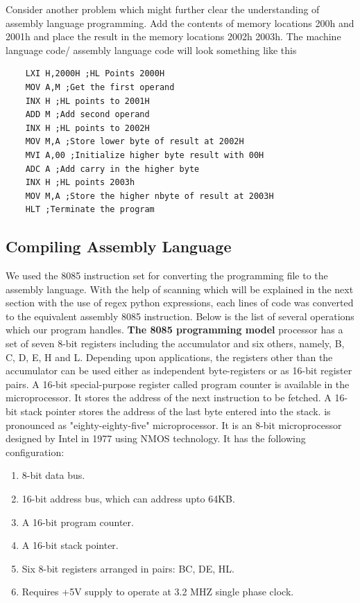 \documentclass[a4paper,12pt]{extarticle}
\begin{document}
	Consider another problem which might further clear the understanding of assembly
	language programming.
	Add the contents of memory locations 200h and 2001h and place the result
	in the memory locations 2002h 2003h.
	The machine language code/ assembly language code will look something like this
	\begin{verbatim}
	LXI H,2000H ;HL Points 2000H
	MOV A,M ;Get the first operand
	INX H ;HL points to 2001H
	ADD M ;Add second operand
	INX H ;HL points to 2002H
	MOV M,A ;Store lower byte of result at 2002H
	MVI A,00 ;Initialize higher byte result with 00H
	ADC A ;Add carry in the higher byte
	INX H ;HL points 2003h
	MOV M,A ;Store the higher nbyte of result at 2003H
	HLT ;Terminate the program
	\end{verbatim}
	\subsection{Compiling Assembly Language}
	We used the 8085 instruction set for converting the programming file to the assembly
	language.\newline
	With the help of scanning which will be explained in the next section with the use of
	regex python expressions, each lines of code was converted to the equivalent assembly
	8085 instruction. Below is the list of several operations which our program handles.\newline
	\textbf{The 8085 programming model}
	 processor has a set of seven 8-bit registers including the accumulator and six
	others, namely, B, C, D, E, H and L. Depending upon applications, the registers
	other than the accumulator can be used either as independent byte-registers or as
	16-bit register pairs. A 16-bit special-purpose register called program counter is
	available in the microprocessor. It stores the address of the next instruction to be
	fetched. A 16-bit stack pointer stores the address of the last byte entered into the
	stack. is pronounced as "eighty-eighty-five" microprocessor. It is an 8-bit microprocessor
	designed by Intel in 1977 using NMOS technology.\newline
	It has the following configuration: 
	\begin{enumerate}
		\item 8-bit data bus.
		\item 16-bit address bus, which can address upto 64KB.
		\item A 16-bit program counter.
		\item A 16-bit stack pointer.
		\item Six 8-bit registers arranged in pairs: BC, DE, HL.
		\item Requires +5V supply to operate at 3.2 MHZ single phase clock.
	\end{enumerate}
\end{document}
